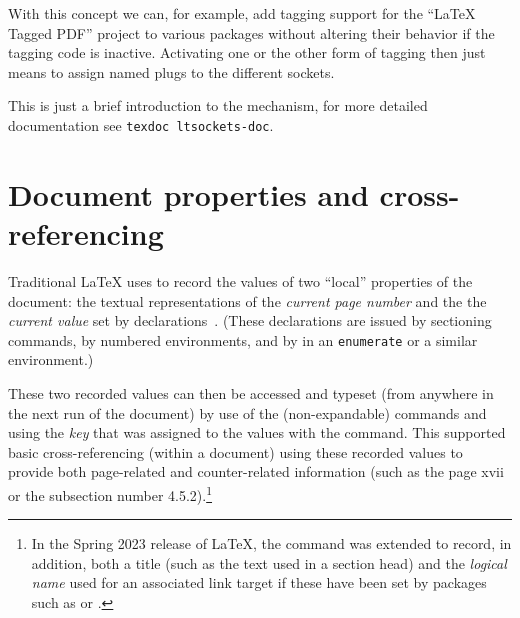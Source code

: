 \documentclass{ltnews}
\providecommand\env[1]{\texttt{#1}}
\providecommand\env[1]{\texttt{#1}}
\begin{document}
With this concept we can, for example, add tagging support for the
\enquote{\LaTeX{} Tagged PDF} project to various packages without
altering their behavior if the tagging code is inactive. Activating
one or the other form of tagging then just means to assign named plugs
to the different sockets.

This is just a brief introduction to the mechanism, for more detailed
documentation see \texttt{texdoc ltsockets-doc}.



\section{Document properties and cross-referencing}

Traditional \LaTeX{} uses  to record the values of
two \enquote{local}
properties of the document: the textual representations of the
\emph{current
page number} and the
the \emph{current \textup{} value} set by
 declarations~\cite[p.~209]{38:Lamport}.
(These declarations are issued by
sectioning commands, by numbered environments, and by  in an
\env{enumerate} or a similar environment.)

These two recorded values can then be accessed and typeset
(from anywhere in the next run of the document) by use of the
(non-expandable) commands  and 
using the \emph{key} that was assigned to the values with the  command.
This supported basic cross-referencing (within a document) using
these recorded values to provide both page-related and counter-related
information (such as the page xvii or the subsection number 4.5.2).\footnote{In the Spring 2023 release of \LaTeX{}, the  command was extended
to record, in addition, both a title (such as the text used in a
section head) and the \emph{logical name} used
for an associated link target
if these have been set by packages such as   or .}



\end{document}
